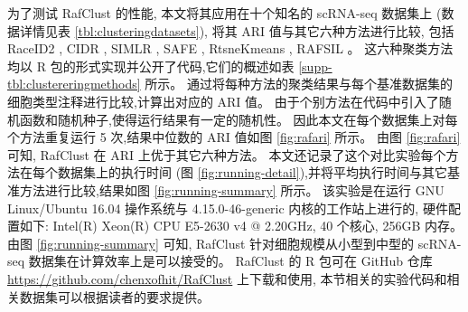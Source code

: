 
为了测试 RafClust 的性能,
本文将其应用在十个知名的 scRNA-seq 数据集上 (数据详情见表 \ref{tbl:clusteringdatasets}),
将其 ARI 值与其它六种方法进行比较,
包括 RaceID2 , CIDR , SIMLR , SAFE , RtsneKmeans , RAFSIL 。
这六种聚类方法均以 R 包的形式实现并公开了代码,它们的概述如表 \ref{supp-tbl:clustereringmethods} 所示。
通过将每种方法的聚类结果与每个基准数据集的细胞类型注释进行比较,计算出对应的 ARI 值。 
由于个别方法在代码中引入了随机函数和随机种子,使得运行结果有一定的随机性。
因此本文在每个数据集上对每个方法重复运行 5 次,结果中位数的 ARI 值如图 \ref{fig:rafari} 所示。
由图 \ref{fig:rafari} 可知, RafClust 在 ARI 上优于其它六种方法。
本文还记录了这个对比实验每个方法在每个数据集上的执行时间 (图 \ref{fig:running-detail}),并将平均执行时间与其它基准方法进行比较,结果如图 \ref{fig:running-summary} 所示。
该实验是在运行 GNU Linux/Ubuntu 16.04 操作系统与 4.15.0-46-generic 内核的工作站上进行的,
硬件配置如下: Intel(R) Xeon(R) CPU E5-2630 v4 @ 2.20GHz, 40 个核心, 256GB 内存。
由图 \ref{fig:running-summary} 可知, RafClust 针对细胞规模从小型到中型的 scRNA-seq 数据集在计算效率上是可以接受的。
RafClust 的 R 包可在 GitHub 仓库 \url{https://github.com/chenxofhit/RafClust} 上下载和使用,
本节相关的实验代码和相关数据集可以根据读者的要求提供。


